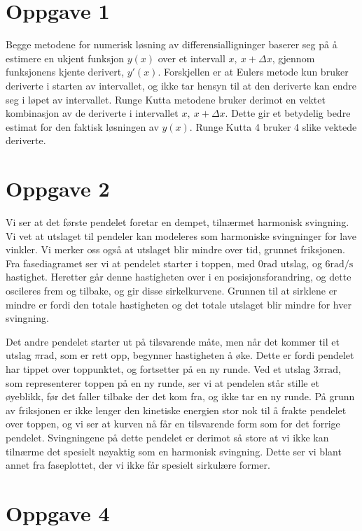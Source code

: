 \documentclass[12p,a4paper]{article}
\begin{document}
\section*{Oppgave 1}
Begge metodene for numerisk løsning av differensialligninger baserer seg på å estimere en ukjent funksjon $y(x)$ over et intervall $x, \ x + \Delta x$, gjennom funksjonens kjente derivert, $y'(x)$. Forskjellen er at Eulers metode kun bruker deriverte i starten av intervallet, og ikke tar hensyn til at den deriverte kan endre seg i løpet av intervallet. Runge Kutta metodene bruker derimot en vektet kombinasjon av de deriverte i intervallet $x, \ x + \Delta x$. Dette gir et betydelig bedre estimat for den faktisk løsningen av $y(x)$. Runge Kutta 4 bruker 4 slike vektede deriverte.


\section*{Oppgave 2}
Vi ser at det første pendelet foretar en dempet, tilnærmet harmonisk svingning. Vi vet at utslaget til pendeler kan modeleres som harmoniske svingninger for lave vinkler. Vi merker oss også at utslaget blir mindre over tid, grunnet friksjonen. Fra fasediagramet ser vi at pendelet starter i toppen, med $0\mathrm{rad}$ utslag, og $6 \mathrm{rad/s}$ hastighet. Heretter går denne hastigheten over i en posisjonsforandring, og dette oscileres frem og tilbake, og gir disse sirkelkurvene. Grunnen til at sirklene er mindre er fordi den totale hastigheten og det totale utslaget blir mindre for hver svingning.

Det andre pendelet starter ut på tilsvarende måte, men når det kommer til et utslag $\pi \mathrm{rad}$, som er rett opp, begynner hastigheten å øke. Dette er fordi pendelet har tippet over toppunktet, og fortsetter på en ny runde. Ved et utslag $3\pi\mathrm{rad}$, som representerer toppen på en ny runde, ser vi at pendelen står stille et øyeblikk, før det faller tilbake der det kom fra, og ikke tar en ny runde. På grunn av friksjonen er ikke lenger den kinetiske energien stor nok til å frakte pendelet over toppen, og vi ser at kurven nå får en tilsvarende form som for det forrige pendelet. Svingningene på dette pendelet er derimot så store at vi ikke kan tilnærme det spesielt nøyaktig som en harmonisk svingning. Dette ser vi blant annet fra faseplottet, der vi ikke får spesielt sirkulære former.



\section*{Oppgave 4}
\end{document}

